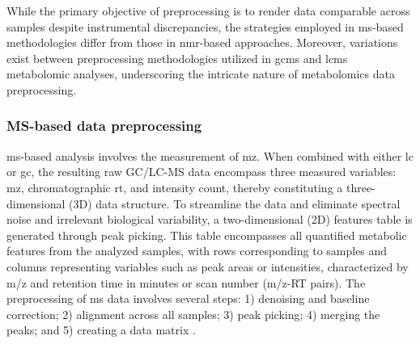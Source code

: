 \documentclass[ENG, BIB]{TFUOC}%
\begin{document}
While the primary objective of preprocessing is to render data comparable across samples despite instrumental discrepancies, the strategies employed in \acrshort{ms}-based methodologies differ from those in \acrshort{nmr}-based approaches. Moreover, variations exist between preprocessing methodologies utilized in \acrshort{gcms} and \acrshort{lcms} metabolomic analyses, underscoring the intricate nature of metabolomics data preprocessing.


\subsubsection{MS-based data preprocessing}

\acrshort{ms}-based analysis involves the measurement of \acrfull{mz}. When combined with either \acrshort{lc} or \acrshort{gc}, the resulting raw GC/LC-MS data encompass three measured variables: \acrshort{mz}, chromatographic \acrfull{rt}, and intensity count, thereby constituting a three-dimensional (3D) data structure.
To streamline the data and eliminate spectral noise and irrelevant biological variability, a two-dimensional (2D) features table is generated through peak picking. This table encompasses all quantified metabolic features from the analyzed samples, with rows corresponding to samples and columns representing variables such as peak areas or intensities, characterized by m/z and retention time in minutes or scan number (m/z-RT pairs).
The preprocessing of \acrshort{ms} data involves several steps: 1) denoising and baseline correction; 2) alignment across all samples; 3) peak picking; 4) merging the peaks; and 5) creating a data matrix \cite{chenGuideMetabolomicsAnalysis2022a,sunPretreatingNormalizingMetabolomics2024,xiaoMetaboliteIdentificationQuantitation2012, defernezChapterElevenStrategies2013,troisiChapterDataAnalysis2022,burtonInstrumentalExperimentalEffects2008,trygg01BackgroundEstimation2009,alonsoAnalyticalMethodsUntargeted2015,bloembergWarpingMethodsSpectroscopic2013}.
\end{document}

